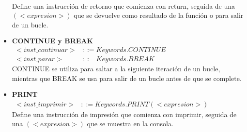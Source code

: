 \begin{itemize}
\begin{math}
\begin{array}{rl}
    \end{array}
  \end{math} \\
  Define una instrucción de retorno que comienza con return, seguida de una $(<expresion>)$ que se devuelve como resultado de la función o para salir de un bucle.
  \item \textbf{CONTINUE y BREAK} \\
  \begin{math}
    \begin{array}{rl}
      <inst\_continuar> & ::= Keywords.CONTINUE \\
      <inst\_parar> & ::= Keywords.BREAK
    \end{array}
  \end{math} \\
  CONTINUE se utiliza para saltar a la siguiente iteración de un bucle, mientras que BREAK se usa para salir de un bucle antes de que se complete.
  \item \textbf{PRINT} \\
  \begin{math}
    \begin{array}{rl}
      <inst\_imprimir> & ::= Keywords.PRINT (<expresion>)
    \end{array}
  \end{math} \\
  Define una instrucción de impresión que comienza con imprimir, seguida de una $(<expresion>)$ que se muestra en la consola.
\end{itemize}

